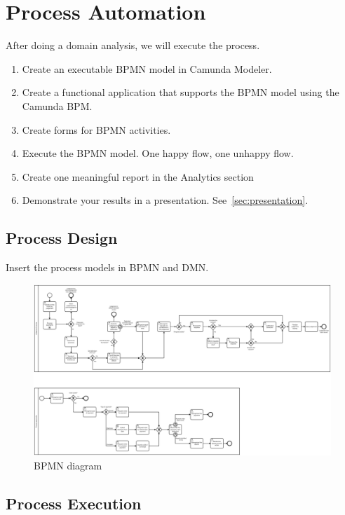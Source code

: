 \chapter{Process Automation}

After doing a domain analysis, we will execute the process. 

\begin{enumerate}
    \item Create an executable BPMN model in Camunda Modeler. 
    \item Create a functional application that supports the BPMN model using the Camunda BPM.
    \item Create forms for BPMN activities. 
    \item Execute the BPMN model. One happy flow, one unhappy flow. 
    \item Create one meaningful report in the Analytics section
    \item Demonstrate your results in a presentation. See~\cref{sec:presentation}. 
\end{enumerate}

\section{Process Design}

Insert the process models in BPMN and DMN. 

\begin{landscape}
    \begin{figure}[h]\centering
        \includegraphics[width=\textwidth]{pic/bpmn}
        \caption{BPMN diagram}
        \label{fig:bpmnModel}
    \end{figure}
\end{landscape}

\section{Process Execution}

